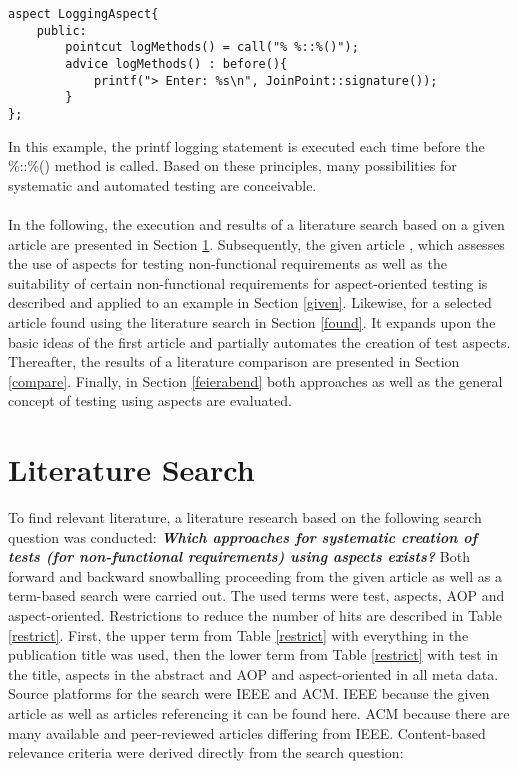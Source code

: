 \lstset {language=C++}
\begin{lstlisting}[caption={\textbf{Logging Aspect in C++.}}, label=logging]
aspect LoggingAspect{
	public:
		pointcut logMethods() = call("% %::%()");
		advice logMethods() : before(){
			printf("> Enter: %s\n", JoinPoint::signature());
		}
};
\end{lstlisting}

\newpage
In this example, the printf logging statement is executed each time before the \%::\%() method is called. Based on these principles, many possibilities for systematic and automated testing are conceivable.\\
\\
In the following, the execution and results of a literature search based on a given article are presented in Section \ref{lit}. Subsequently, the given article , which assesses the use of aspects for testing non-functional requirements as well as the suitability of certain non-functional requirements for aspect-oriented testing is described and applied to an example in Section \ref{given}. Likewise, for a selected article found using the literature search in Section \ref{found}.  It expands upon the basic ideas of the first article and partially automates the creation of test aspects. Thereafter, the results of a literature comparison are presented in Section \ref{compare}. Finally, in Section \ref{feierabend} both approaches as well as the general concept of testing using aspects are evaluated. 

\section{ Literature Search} \label{lit}

To find relevant literature, a literature research based on the following search question was conducted: \textbf{\textit{Which approaches for systematic creation of tests (for non-functional requirements) using aspects exists?}} Both forward and backward snowballing proceeding from the given article as well as a term-based search were carried out. The used terms were test, aspects, AOP and aspect-oriented. Restrictions to reduce the number of hits are described in Table \ref{restrict}. First, the upper term from Table \ref{restrict} with everything in the publication title was used, then the lower term from Table \ref{restrict} with test in the title, aspects in the abstract and AOP and aspect-oriented in all meta data. Source platforms for the search were IEEE and ACM. IEEE because the given article as well as articles referencing it can be found here. ACM because there are many available and peer-reviewed articles differing from IEEE. Content-based relevance criteria were derived directly from the search question:

